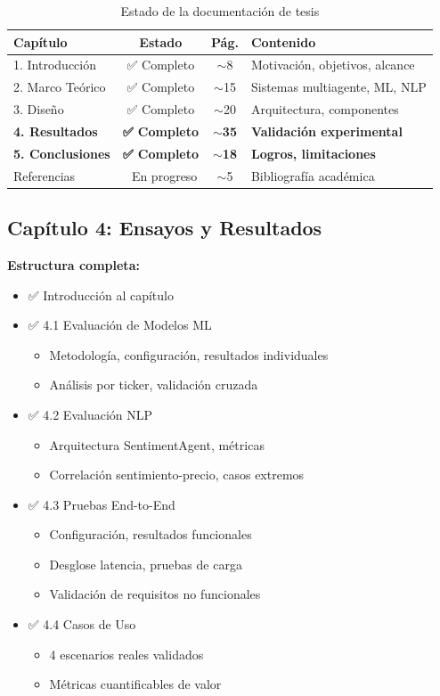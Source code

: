 \documentclass[12pt,a4paper]{article}
\begin{document}
\begin{table}[H]
\centering
\begin{tabular}{lccp{6cm}}
\toprule
\textbf{Capítulo} & \textbf{Estado} & \textbf{Pág.} & \textbf{Contenido} \\
\midrule
1. Introducción & ✅ Completo & $\sim$8 & Motivación, objetivos, alcance \\
2. Marco Teórico & ✅ Completo & $\sim$15 & Sistemas multiagente, ML, NLP \\
3. Diseño & ✅ Completo & $\sim$20 & Arquitectura, componentes \\
\textbf{4. Resultados} & \textbf{✅ Completo} & \textbf{$\sim$35} & \textbf{Validación experimental} \\
\textbf{5. Conclusiones} & \textbf{✅ Completo} & \textbf{$\sim$18} & \textbf{Logros, limitaciones} \\
Referencias & 🔄 En progreso & $\sim$5 & Bibliografía académica \\
\bottomrule
\end{tabular}
\caption{Estado de la documentación de tesis}
\end{table}

\subsection{Capítulo 4: Ensayos y Resultados}

\textbf{Estructura completa:}
\begin{itemize}
    \item ✅ Introducción al capítulo
    \item ✅ 4.1 Evaluación de Modelos ML
    \begin{itemize}
        \item Metodología, configuración, resultados individuales
        \item Análisis por ticker, validación cruzada
    \end{itemize}
    \item ✅ 4.2 Evaluación NLP
    \begin{itemize}
        \item Arquitectura SentimentAgent, métricas
        \item Correlación sentimiento-precio, casos extremos
    \end{itemize}
    \item ✅ 4.3 Pruebas End-to-End
    \begin{itemize}
        \item Configuración, resultados funcionales
        \item Desglose latencia, pruebas de carga
        \item Validación de requisitos no funcionales
    \end{itemize}
    \item ✅ 4.4 Casos de Uso
    \begin{itemize}
        \item 4 escenarios reales validados
        \item Métricas cuantificables de valor
    \end{itemize}
\end{itemize}
\end{document}
